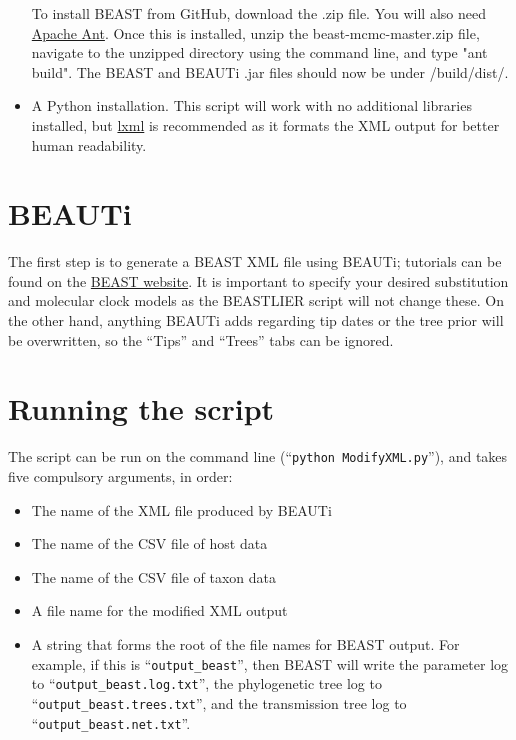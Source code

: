 \documentclass[]{article}
\begin{document}
\begin{itemize}
{	To install BEAST from GitHub, download the .zip file. You will also need \href{http://ant.apache.org/}{Apache Ant}. Once this is installed, unzip the beast-mcmc-master.zip file, navigate to the unzipped directory using the command line, and type "ant build". The BEAST and BEAUTi .jar files should now be under /build/dist/.}
	\item{A Python installation. This script will work with no additional libraries installed, but \href{http://lxml.de/}{lxml} is recommended as it formats the XML output for better human readability.}
\end{itemize}

\section{BEAUTi}

The first step is to generate a BEAST XML file using BEAUTi; tutorials can be found on the \href{http://beast.bio.ed.ac.uk/}{BEAST website}. It is important to specify your desired substitution and molecular clock models as the BEASTLIER script will not change these. On the other hand, anything BEAUTi adds regarding tip dates or the tree prior will be overwritten, so the ``Tips'' and ``Trees'' tabs can be ignored.

\section{Running the script}

The script can be run on the command line (``{\tt python ModifyXML.py}''), and takes five compulsory arguments, in order:

\begin{itemize}
	\item{The name of the XML file produced by BEAUTi}
	\item{The name of the CSV file of host data}
	\item{The name of the CSV file of taxon data}
	\item{A file name for the modified XML output}
	\item{A string that forms the root of the file names for BEAST output. For example, if this is ``{\tt output\_beast}'', then BEAST will write the parameter log to ``{\tt output\_beast.log.txt}'', the phylogenetic tree log to ``{\tt output\_beast.trees.txt}'', and the transmission tree log to ``{\tt output\_beast.net.txt}''.}
\end{itemize}
\end{document}
